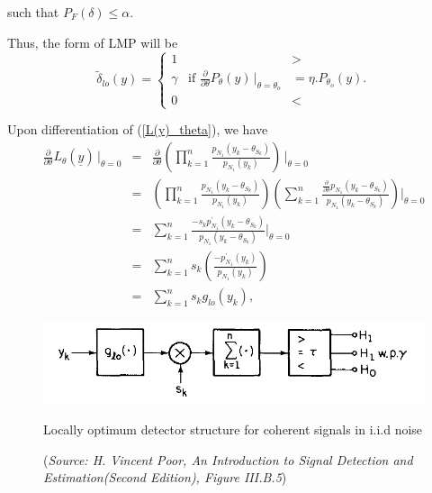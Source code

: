 \documentclass[a4paper,english,12pt]{article}
\begin{document}
\begin{exmp}
\begin{note}
\begin{equation}
\end{equation}
such that $P_{F}(\delta)\leq\alpha$.
\par Thus, the form of LMP will be
\begin{equation}
\tilde\delta_{lo}(y)=\begin{cases}
1&>\\
\gamma\hspace{10pt}\text{if }\frac{\partial}{\partial\theta}P_{\theta}(y)\hspace{2pt}\big|_{\theta=\theta_{o}}&=\eta.P_{\theta_{o}}(y).\\
0&<
\end{cases}
\end{equation} 
\end{note}
Upon differentiation of (\ref{L(y)_theta}), we have
\begin{eqnarray}
\frac{{\partial}}{\partial\theta}L_{\theta}(\underline{y})\hspace{2pt}|_{\theta=0}&=&\frac{\partial}{\partial\theta}\left(\prod_{k=1}^n\frac{p_{N_{1}}(y_{k}-\theta_{S_{k}})}{p_{N_{1}}(y_{k})}\right)\hspace{2pt}\Bigg|_{\theta=0}\nonumber\\
&=&\left(\prod_{k=1}^n\frac{p_{N_{1}}(y_{k}-\theta_{S_{k}})}{p_{N_{1}}(y_{k})}\right)\left(\sum_{k=1}^{n}\frac{\frac{\partial}{\partial\theta}p_{N_{1}}(y_{k}-\theta_{S_{k}})}{p_{N_{1}}(y_{k}-\theta_{S_{k}})}\right)\Bigg|_{\theta=0}\nonumber\\
&=&\sum_{k=1}^{n}\frac{-s_{k}p_{N_{1}}^\prime(y_{k}-\theta_{S_{k}})}{p_{N_{1}}(y_{k}-\theta_{S_{k}})}\Bigg|_{\theta=0}\nonumber\\
&=&\sum_{k=1}^{n}s_{k}\left(\frac{-p_{N_{1}}^\prime(y_{k})}{p_{N_{1}}(y_{k})}\right)\nonumber\\
&=&\sum_{k=1}^{n}s_{k}g_{lo}(y_{k}),
\end{eqnarray}
\begin{figure}[h]
\centering
\captionsetup{justification=centering}
\includegraphics[width=0.8\linewidth]{Figures/lec10Fig4}
\caption{Locally optimum detector structure for coherent signals in i.i.d noise}
\caption*{\footnotesize(\textit{Source: H. Vincent Poor, An Introduction to Signal Detection and Estimation(Second Edition), Figure	 III.B.5})}
\label{fig:Fig4}
\end{figure}\

\end{exmp}
\end{document}
